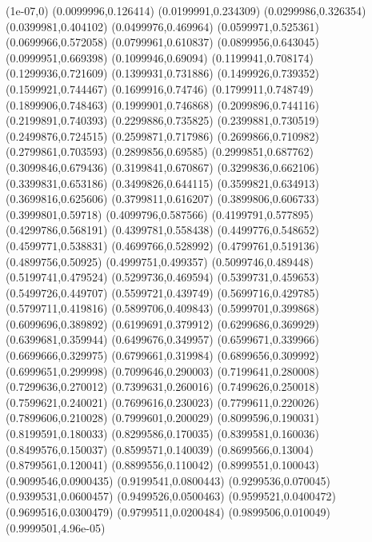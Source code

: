 \expandafter\def\csname heapTam@W_6\endcsname{(1e-07,0) (0.0099996,0.126414) (0.0199991,0.234309) (0.0299986,0.326354) (0.0399981,0.404102) (0.0499976,0.469964) (0.0599971,0.525361) (0.0699966,0.572058) (0.0799961,0.610837) (0.0899956,0.643045) (0.0999951,0.669398) (0.1099946,0.69094) (0.1199941,0.708174) (0.1299936,0.721609) (0.1399931,0.731886) (0.1499926,0.739352) (0.1599921,0.744467) (0.1699916,0.74746) (0.1799911,0.748749) (0.1899906,0.748463) (0.1999901,0.746868) (0.2099896,0.744116) (0.2199891,0.740393) (0.2299886,0.735825) (0.2399881,0.730519) (0.2499876,0.724515) (0.2599871,0.717986) (0.2699866,0.710982) (0.2799861,0.703593) (0.2899856,0.69585) (0.2999851,0.687762) (0.3099846,0.679436) (0.3199841,0.670867) (0.3299836,0.662106) (0.3399831,0.653186) (0.3499826,0.644115) (0.3599821,0.634913) (0.3699816,0.625606) (0.3799811,0.616207) (0.3899806,0.606733) (0.3999801,0.59718) (0.4099796,0.587566) (0.4199791,0.577895) (0.4299786,0.568191) (0.4399781,0.558438) (0.4499776,0.548652) (0.4599771,0.538831) (0.4699766,0.528992) (0.4799761,0.519136) (0.4899756,0.50925) (0.4999751,0.499357) (0.5099746,0.489448) (0.5199741,0.479524) (0.5299736,0.469594) (0.5399731,0.459653) (0.5499726,0.449707) (0.5599721,0.439749) (0.5699716,0.429785) (0.5799711,0.419816) (0.5899706,0.409843) (0.5999701,0.399868) (0.6099696,0.389892) (0.6199691,0.379912) (0.6299686,0.369929) (0.6399681,0.359944) (0.6499676,0.349957) (0.6599671,0.339966) (0.6699666,0.329975) (0.6799661,0.319984) (0.6899656,0.309992) (0.6999651,0.299998) (0.7099646,0.290003) (0.7199641,0.280008) (0.7299636,0.270012) (0.7399631,0.260016) (0.7499626,0.250018) (0.7599621,0.240021) (0.7699616,0.230023) (0.7799611,0.220026) (0.7899606,0.210028) (0.7999601,0.200029) (0.8099596,0.190031) (0.8199591,0.180033) (0.8299586,0.170035) (0.8399581,0.160036) (0.8499576,0.150037) (0.8599571,0.140039) (0.8699566,0.13004) (0.8799561,0.120041) (0.8899556,0.110042) (0.8999551,0.100043) (0.9099546,0.0900435) (0.9199541,0.0800443) (0.9299536,0.070045) (0.9399531,0.0600457) (0.9499526,0.0500463) (0.9599521,0.0400472) (0.9699516,0.0300479) (0.9799511,0.0200484) (0.9899506,0.010049) (0.9999501,4.96e-05)}
